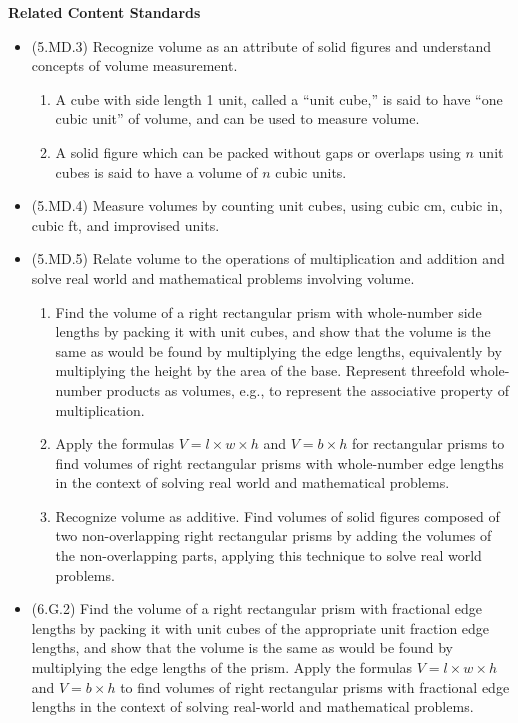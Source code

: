 \documentclass[
]{book}
\providecommand{\tightlist}{%
  \setlength{\itemsep}{0pt}\setlength{\parskip}{0pt}}
\newenvironment{standards}{}{}
\theoremstyle{definition}
\theoremstyle{definition}
\theoremstyle{definition}
\theoremstyle{definition}
\theoremstyle{remark}
\begin{document}
\begin{standards}

\begin{center}
\textbf{Related Content Standards}

\end{center}

\begin{itemize}
\tightlist
\item
  (5.MD.3) Recognize volume as an attribute of solid figures and understand concepts of volume measurement.

  \begin{enumerate}
  \def\labelenumi{\alph{enumi}.}
  \tightlist
  \item
    A cube with side length 1 unit, called a ``unit cube,'' is said to have ``one cubic unit'' of volume, and can be used to measure volume.
  \item
    A solid figure which can be packed without gaps or overlaps using \(n\) unit cubes is said to have a volume of \(n\) cubic units.
  \end{enumerate}
\item
  (5.MD.4) Measure volumes by counting unit cubes, using cubic cm, cubic in, cubic ft, and improvised units.
\item
  (5.MD.5) Relate volume to the operations of multiplication and addition and solve real world and mathematical problems involving volume.

  \begin{enumerate}
  \def\labelenumi{\alph{enumi}.}
  \tightlist
  \item
    Find the volume of a right rectangular prism with whole-number side lengths by packing it with unit cubes, and show that the volume is the same as would be found by multiplying the edge lengths, equivalently by multiplying the height by the area of the base. Represent threefold whole-number products as volumes, e.g., to represent the associative property of multiplication.
  \item
    Apply the formulas \(V = l \times w \times h\) and \(V = b \times h\) for rectangular prisms to find volumes of right rectangular prisms with whole-number edge lengths in the context of solving real world and mathematical problems.
  \item
    Recognize volume as additive. Find volumes of solid figures composed of two non-overlapping right rectangular prisms by adding the volumes of the non-overlapping parts, applying this technique to solve real world problems.
  \end{enumerate}
\item
  (6.G.2) Find the volume of a right rectangular prism with fractional edge lengths by packing it with unit cubes of the appropriate unit fraction edge lengths, and show that the volume is the same as would be found by multiplying the edge lengths of the prism. Apply the formulas \(V = l \times w \times h\) and \(V = b \times h\) to find volumes of right rectangular prisms with fractional edge lengths in the context of solving real-world and mathematical problems.
\end{itemize}

\end{standards}
\end{document}
